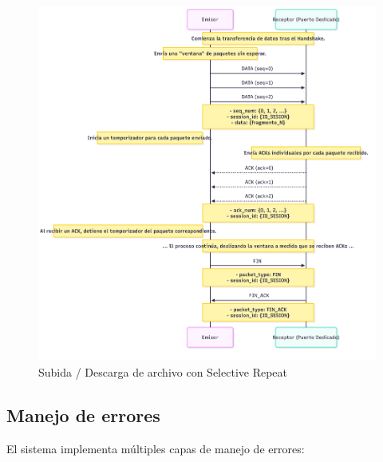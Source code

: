\begin{figure}[H]
    \centering
    \includegraphics[height=0.8\textheight]{images/UPLOAD_DOWNLOAD_SR}
    \caption{Subida / Descarga de archivo con Selective Repeat}
    \label{fig:upload_download_sr}
\end{figure}

\subsection{Manejo de errores}
El sistema implementa múltiples capas de manejo de errores:

